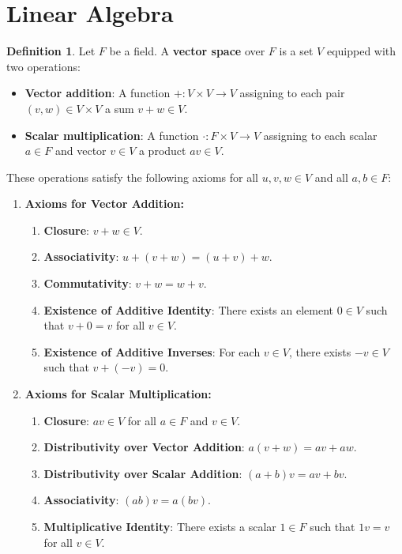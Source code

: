 \documentclass{article}
\theoremstyle{definition}
\newtheorem{definition}{Definition}[section]
\theoremstyle{remark}
\begin{document}



\section{Linear Algebra}



\begin{definition}
Let \( F \) be a field. A \textbf{vector space} over \( F \) is a set \( V \) equipped with two operations:
\begin{itemize}
\item \textbf{Vector addition}: A function \( +: V \times V \to V \) assigning to each pair \( (v, w) \in V \times V \) a sum \( v + w \in V \).
\item \textbf{Scalar multiplication}: A function \( \cdot: F \times V \to V \) assigning to each scalar \( a \in F \) and vector \( v \in V \) a product \( av \in V \).
\end{itemize}
These operations satisfy the following axioms for all \( u, v, w \in V \) and all \( a, b \in F \):

\begin{enumerate}
\item \textbf{Axioms for Vector Addition:}
\begin{enumerate}
\item \textbf{Closure}: \( v + w \in V \).
\item \textbf{Associativity}: \( u + (v + w) = (u + v) + w \).
\item \textbf{Commutativity}: \( v + w = w + v \).
\item \textbf{Existence of Additive Identity}: There exists an element \( 0 \in V \) such that \( v + 0 = v \) for all \( v \in V \).
\item \textbf{Existence of Additive Inverses}: For each \( v \in V \), there exists \( -v \in V \) such that \( v + (-v) = 0 \).
\end{enumerate}

\item \textbf{Axioms for Scalar Multiplication:}
\begin{enumerate}
\item \textbf{Closure}: \( av \in V \) for all \( a \in F \) and \( v \in V \).
\item \textbf{Distributivity over Vector Addition}: \( a(v + w) = av + aw \).
\item \textbf{Distributivity over Scalar Addition}: \( (a + b)v = av + bv \).
\item \textbf{Associativity}: \( (ab)v = a(bv) \).
\item \textbf{Multiplicative Identity}: There exists a scalar \( 1 \in F \) such that \( 1v = v \) for all \( v \in V \).
\end{enumerate}
\end{enumerate}

\end{definition}
\end{document}
